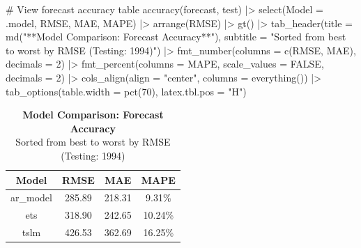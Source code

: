 \documentclass[
  letterpaper,
  DIV=11,
  numbers=noendperiod]{scrartcl}
\newenvironment{Shaded}{\begin{snugshade}}{\end{snugshade}}
\newcommand{\AttributeTok}[1]{\textcolor[rgb]{0.40,0.45,0.13}{#1}}
\newcommand{\CommentTok}[1]{\textcolor[rgb]{0.37,0.37,0.37}{#1}}
\newcommand{\ConstantTok}[1]{\textcolor[rgb]{0.56,0.35,0.01}{#1}}
\newcommand{\DecValTok}[1]{\textcolor[rgb]{0.68,0.00,0.00}{#1}}
\newcommand{\FunctionTok}[1]{\textcolor[rgb]{0.28,0.35,0.67}{#1}}
\newcommand{\NormalTok}[1]{\textcolor[rgb]{0.00,0.23,0.31}{#1}}
\newcommand{\SpecialCharTok}[1]{\textcolor[rgb]{0.37,0.37,0.37}{#1}}
\newcommand{\StringTok}[1]{\textcolor[rgb]{0.13,0.47,0.30}{#1}}
\begin{document}
\begin{Shaded}
\begin{Highlighting}[]
\CommentTok{\# View forecast accuracy table}
\FunctionTok{accuracy}\NormalTok{(forecast, test) }\SpecialCharTok{|\textgreater{}}
  \FunctionTok{select}\NormalTok{(}\AttributeTok{Model =}\NormalTok{ .model, RMSE, MAE, MAPE) }\SpecialCharTok{|\textgreater{}}
  \FunctionTok{arrange}\NormalTok{(RMSE) }\SpecialCharTok{|\textgreater{}}
  \FunctionTok{gt}\NormalTok{() }\SpecialCharTok{|\textgreater{}}
  \FunctionTok{tab\_header}\NormalTok{(}\AttributeTok{title =} \FunctionTok{md}\NormalTok{(}\StringTok{"**Model Comparison: Forecast Accuracy**"}\NormalTok{),}
    \AttributeTok{subtitle =} \StringTok{"Sorted from best to worst by RMSE (Testing: 1994)"}\NormalTok{) }\SpecialCharTok{|\textgreater{}}
  \FunctionTok{fmt\_number}\NormalTok{(}\AttributeTok{columns =} \FunctionTok{c}\NormalTok{(RMSE, MAE), }\AttributeTok{decimals =} \DecValTok{2}\NormalTok{) }\SpecialCharTok{|\textgreater{}}
  \FunctionTok{fmt\_percent}\NormalTok{(}\AttributeTok{columns =}\NormalTok{ MAPE, }\AttributeTok{scale\_values =} \ConstantTok{FALSE}\NormalTok{, }\AttributeTok{decimals =} \DecValTok{2}\NormalTok{) }\SpecialCharTok{|\textgreater{}}
  \FunctionTok{cols\_align}\NormalTok{(}\AttributeTok{align =} \StringTok{"center"}\NormalTok{, }\AttributeTok{columns =} \FunctionTok{everything}\NormalTok{()) }\SpecialCharTok{|\textgreater{}}
  \FunctionTok{tab\_options}\NormalTok{(}\AttributeTok{table.width =} \FunctionTok{pct}\NormalTok{(}\DecValTok{70}\NormalTok{), }\AttributeTok{latex.tbl.pos =} \StringTok{"H"}\NormalTok{)}
\end{Highlighting}
\end{Shaded}

\begin{table}
\caption*{
{\fontsize{20}{25}\selectfont  \textbf{Model Comparison: Forecast Accuracy}\fontsize{12}{15}\selectfont } \\ 
{\fontsize{14}{17}\selectfont  Sorted from best to worst by RMSE (Testing: 1994)\fontsize{12}{15}\selectfont }
} 
\fontsize{12.0pt}{14.0pt}\selectfont
\begin{tabular*}{0.7\linewidth}{@{\extracolsep{\fill}}cccc}
\toprule
Model & RMSE & MAE & MAPE \\ 
\midrule\addlinespace[2.5pt]
ar\_model & 285.89 & 218.31 & 9.31\% \\ 
ets & 318.90 & 242.65 & 10.24\% \\ 
tslm & 426.53 & 362.69 & 16.25\% \\ 
\bottomrule
\end{tabular*}
\end{table}
\end{document}
